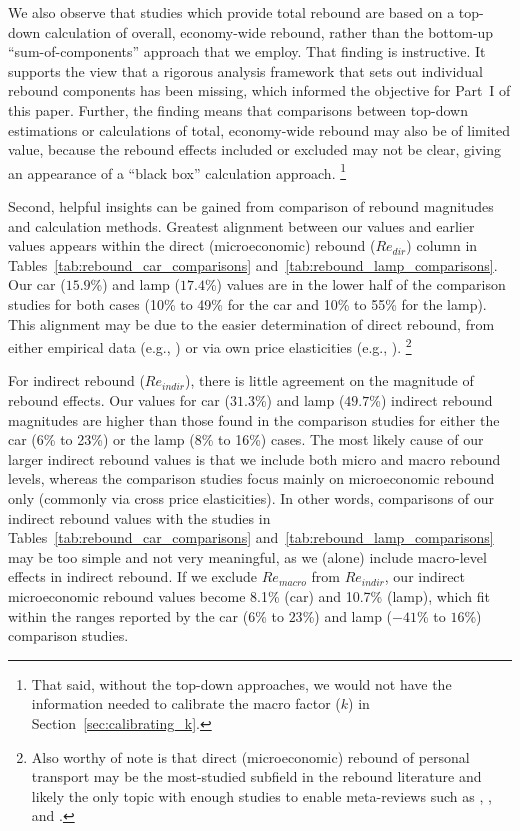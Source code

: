 \documentclass[12pt]{article}\usepackage[]{graphicx}\usepackage[]{xcolor}
\begin{document}
We also observe that studies which provide total rebound 
are based on a top-down calculation of overall, economy-wide rebound, 
rather than the bottom-up ``sum-of-components'' approach 
that we employ.
That finding is instructive. 
It supports the view that
a rigorous analysis framework that sets out individual rebound components
has been missing, which
informed the objective for Part~I of this paper.
Further, the finding means that 
comparisons between top-down estimations or calculations 
of total, economy-wide rebound 
may also be of limited value,
because the rebound effects included or excluded may not be clear, 
giving an appearance of a ``black box'' calculation approach.%
\footnote{
  That said, without the top-down approaches,
  we would not have the information needed to calibrate 
  the macro factor ($k$) in Section~\ref{sec:calibrating_k}.
}

Second, helpful insights can be gained
from comparison of rebound magnitudes and calculation methods.
Greatest alignment between our values and earlier values
appears within the direct (microeconomic) rebound ($Re_{dir}$) column
in Tables~\ref{tab:rebound_car_comparisons} and~\ref{tab:rebound_lamp_comparisons}.
Our car ($15.9$\%) and lamp ($17.4$\%) values
are in the lower half of the comparison studies
for both cases (10\% to 49\% for the car and 10\% to 55\% for the lamp).
This alignment may be due to the easier determination
of direct rebound, from either empirical data
(e.g., \citet{Small:2007aa}) or
via own price elasticities (e.g., \citet{Chitnis:2015}).%
\footnote{
  Also worthy of note is that direct (microeconomic) rebound 
  of personal transport may be the most-studied subfield 
  in the rebound literature and likely the only topic with enough studies
  to enable meta-reviews such as 
  \citet{Sorrell:2009aa}, 
  \citet{Dimitropoulos:2018aa}, and 
  \citet{Gillingham:2020aa}.
}


For indirect rebound ($Re_{indir}$),
there is little agreement on the magnitude of rebound effects.
Our values for 
car ($31.3$\%) and 
lamp ($49.7$\%) indirect rebound magnitudes
are higher than those found in the comparison studies
for either the car (6\% to 23\%) or the lamp (8\% to 16\%) cases.
The most likely cause of our larger indirect rebound values
is that we include both micro and macro rebound levels,
whereas the comparison studies 
focus mainly on microeconomic rebound only
(commonly via cross price elasticities).
In other words, 
comparisons of our indirect rebound values with the studies
in Tables~\ref{tab:rebound_car_comparisons} and~\ref{tab:rebound_lamp_comparisons}
may be too simple and not very meaningful,
as we (alone) include macro-level effects in indirect rebound. 
If we exclude $Re_{macro}$ from $Re_{indir}$, 
our indirect microeconomic rebound values become 
8.1\% (car) and
10.7\% (lamp),
which fit within the ranges reported by the
car ($6$\% to $23$\%) and lamp ($-41$\% to $16$\%)
comparison studies.
\end{document}
